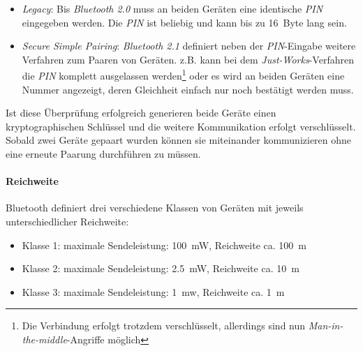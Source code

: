                 \begin{itemize}
                    \item{\emph{Legacy}:} Bis \emph{Bluetooth 2.0} muss an beiden Geräten eine identische \emph{PIN}
                                   eingegeben werden. Die \emph{PIN} ist beliebig und kann bis zu
                                   16~Byte lang sein.
                    \item{\emph{Secure Simple Pairing}:} \emph{Bluetooth 2.1} definiert neben der \emph{PIN}-Eingabe
                                                  weitere Verfahren zum Paaren von Geräten.
                                                  z.B. kann bei dem \emph{Just-Works}-Verfahren
                                                  die \emph{PIN} komplett ausgelassen werden\footnote{Die
                                                  Verbindung erfolgt trotzdem verschlüsselt,
                                                  allerdings sind nun \emph{Man-in-the-middle}-Angriffe 
                                                  möglich} oder es wird an beiden Geräten eine
                                                  Nummer angezeigt, deren Gleichheit einfach
                                                  nur noch bestätigt werden muss.
                \end{itemize}

                Ist diese Überprüfung erfolgreich generieren beide Geräte einen kryptographischen
                Schlüssel und die weitere Kommunikation erfolgt verschlüsselt. Sobald zwei
                Geräte gepaart wurden können sie miteinander kommunizieren ohne eine erneute
                Paarung durchführen zu müssen.

            \paragraph{Reichweite}
                Bluetooth definiert drei verschiedene Klassen von Geräten mit jeweils
                unterschiedlicher Reichweite:

                \begin{itemize}
                    \item{Klasse 1:} maximale Sendeleistung: 100~mW, Reichweite ca. 100~m
                    \item{Klasse 2:} maximale Sendeleistung: 2.5~mW, Reichweite ca. 10~m
                    \item{Klasse 3:} maximale Sendeleistung:   1~mw, Reichweite ca. 1~m
                \end{itemize}

